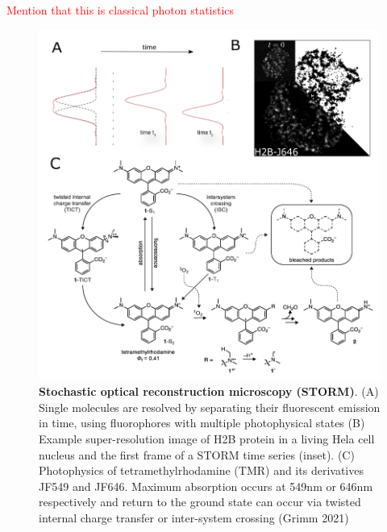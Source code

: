 \documentclass{ucetd}
\begin{document}
\textcolor{red}{Mention that this is classical photon statistics}

\begin{figure}
\includegraphics[width=16cm]{Concept.png}
\caption{\textbf{Stochastic optical reconstruction microscopy (STORM)}. (A) Single molecules are resolved by separating their fluorescent emission in time, using fluorophores with multiple photophysical states (B) Example super-resolution image of H2B protein in a living Hela cell nucleus and the first frame of a STORM time series (inset). (C) Photophysics of tetramethylrhodamine (TMR) and its derivatives JF549 and JF646. Maximum absorption occurs at 549nm or 646nm respectively and return to the ground state can occur via twisted internal charge transfer or inter-system crossing (Grimm 2021)}
\end{figure}
\end{document}
